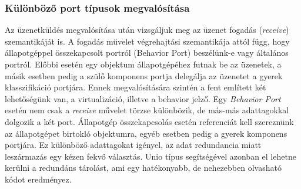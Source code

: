 \documentclass[a4paper,12pt]{report}
\begin{document}
\subsubsection{Különböző port típusok megvalósítása}
Az üzenetküldés megvalósítása után vizsgáljuk meg az üzenet fogadás (\textit{receive}) szemantikáját is. A fogadás művelet végrehajtási szemantikája attól függ, hogy állapotgéppel összekapcsolt portról (Behavior Port) beszélünk-e vagy általános portról. Előbbi esetén egy objektum állapotgépéhez futnak be az üzenetek, a másik esetben pedig a szülő komponens portja delegálja az üzenetet a gyerek klasszifikáció portjára. Ennek megvalósítására szintén a fent említett két lehetőségünk van, a virtualizáció, illetve a behavior jelző. Egy \textit{Behavior Port} esetén nem csak a \textit{receive} művelet törzse különbözik, de más-más adattagokkal dolgozik a két port. Állapotgép összekapcsolás esetén referenciát kell szereznünk az állapotgépet birtokló objektumra, egyéb esetben pedig a gyerek komponens portjára. Ez különböző adattagokat igényel, az adat redundancia miatt leszármazás egy kézen fekvő választás. Unio típus segítségével azonban el lehetne kerülni a redundáns tárolást, ami egy hatékonyabb, de nehezebben olvasható kódot eredményez.
\end{document}
